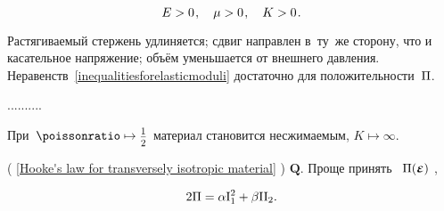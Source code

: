 \noindent
\begin{equation}\label{inequalitiesforelasticmoduli}
E > 0 \hspace{.2ex} , \hspace{1em}
\mu > 0 \hspace{.2ex} , \hspace{1em}
K > 0 \hspace{.2ex}
.
\end{equation}

\noindent
Растягиваемый стержень удлиняется;
сдвиг направлен в~ту~же сторону, что и касательное напряжение;
объём уменьшается от внешнего давления.
Неравенств~\eqref{inequalitiesforelasticmoduli}
достаточно для положительности~$\Pi$.

..........

При~${ \poissonratio \mapsto \smalldisplaystyleonehalf }$
материал становится несжимаемым, ${ K \mapsto \infty }$.

( \eqref{Hooke's law for transversely isotropic material} )
$\bm{Q}$.
Проще принять\ru{,}
~$\potential(\infinitesimaldeformation)$
,
~

\begin{equation}
2 \Pi = \alpha \mathrm{I}_1 ^2 + \beta \mathrm{II}_2 .
\end{equation}

